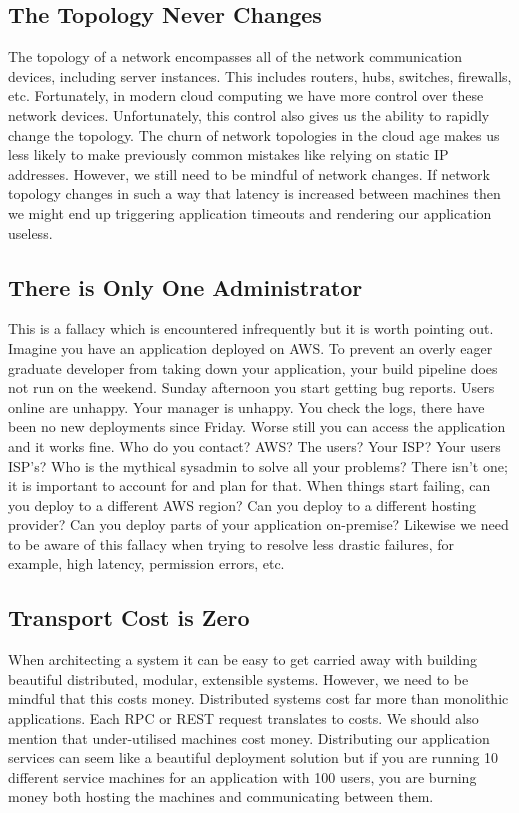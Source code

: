 \subsection{The Topology Never Changes}
The topology of a network encompasses all of the network communication devices, including server instances.
This includes routers, hubs, switches, firewalls, etc.
Fortunately, in modern cloud computing we have more control over these network devices.
Unfortunately, this control also gives us the ability to rapidly change the topology.
The churn of network topologies in the cloud age makes us less likely to make previously common mistakes like relying on static IP addresses.
However, we still need to be mindful of network changes.
If network topology changes in such a way that latency is increased between machines then we might end up triggering application timeouts and rendering our application useless.

\subsection{There is Only One Administrator}
This is a fallacy which is encountered infrequently but it is worth pointing out.
Imagine you have an application deployed on AWS.
To prevent an overly eager graduate developer from taking down your application,
your build pipeline does not run on the weekend.
Sunday afternoon you start getting bug reports.
Users online are unhappy.
Your manager is unhappy.
You check the logs,
there have been no new deployments since Friday.
Worse still you can access the application and it works fine.
Who do you contact?
AWS? The users? Your ISP? Your users ISP's?
Who is the mythical sysadmin to solve all your problems?
There isn't one; it is important to account for and plan for that.
When things start failing, can you deploy to a different AWS region?
Can you deploy to a different hosting provider?
Can you deploy parts of your application on-premise?
Likewise we need to be aware of this fallacy when trying to resolve less drastic failures, for example, high latency, permission errors, etc.

\subsection{Transport Cost is Zero}
When architecting a system it can be easy to get carried away with building beautiful distributed, modular, extensible systems.
However, we need to be mindful that this costs money.
Distributed systems cost far more than monolithic applications.
Each RPC or REST request translates to costs.
We should also mention that under-utilised machines cost money.
Distributing our application services can seem like a beautiful deployment solution
but if you are running 10 different service machines for an application with 100 users,
you are burning money both hosting the machines and communicating between them.

